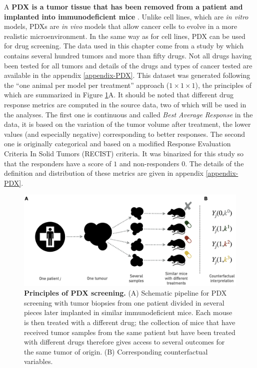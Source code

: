 \documentclass[a4paper,12pt,twoside,onecolumn,openright,final,oldfontcommands]{memoir}
\begin{document}
A \textbf{PDX is a tumor tissue that has been removed from a patient and
implanted into immunodeficient mice} \citep{hidalgo2014patient}. Unlike
cell lines, which are \emph{in vitro} models, PDXs are \emph{in vivo}
models that allow cancer cells to evolve in a more realistic
microenvironment. In the same way as for cell lines, PDX can be used for
drug screening. The data used in this chapter come from a study by
\citet{gao2015high} which contains several hundred tumors and more than
fifty drugs. Not all drugs having been tested for all tumors and details
of the drugs and types of cancer tested are available in the appendix
\ref{appendix-PDX}. This dataset was generated following the ``one
animal per model per treatment'' approach (\(1 \times 1 \times 1\)), the
principles of which are summarized in Figure \ref{fig:PDX-principles}A.
It should be noted that different drug response metrics are computed in
the source data, two of which will be used in the analyses. The first
one is continuous and called \emph{Best Average Response} in the data,
it is based on the variation of the tumor volume after treatment, the
lower values (and especially negative) corresponding to better
responses. The second one is originally categorical and based on a
modified Response Evaluation Criteria In Solid Tumors (RECIST) criteria.
It was binarized for this study so that the responders have a score of
\(1\) and non-responders \(0\). The details of the definition and
distribution of these metrics are given in appendix \ref{appendix-PDX}.

\begin{figure}

{\centering \includegraphics[width=0.9\linewidth]{fig/PDX} 

}

\caption[Principles of PDX screening]{\textbf{Principles of PDX screening.} (A)
Schematic pipeline for PDX screening with tumor biopsies from one
patient divided in several pieces later implanted in similar
immunodeficient mice. Each mouse is then treated with a different drug;
the collection of mice that have received tumor samples from the same
patient but have been treated with different drugs therefore gives
access to several outcomes for the same tumor of origin. (B)
Corresponding counterfactual variables.}\label{fig:PDX-principles}
\end{figure}
\end{document}
